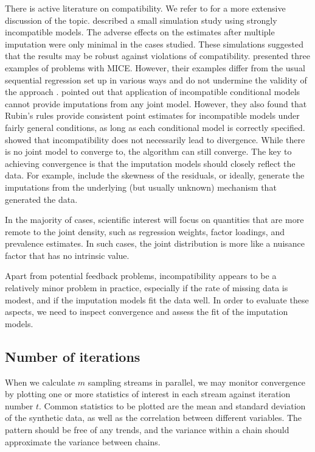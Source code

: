 \documentclass[
]{book}
\begin{document}
There is active literature on compatibility. We refer to \citet{VANBUUREN2018} for a more extensive discussion of the topic. \citet{VANBUUREN2006} described a small simulation study using strongly incompatible models. The adverse effects on the estimates after multiple imputation were only minimal in the cases studied. These simulations suggested that the results may be robust against violations of compatibility. \citet{LI2012} presented three examples of problems with MICE. However, their examples differ from the usual sequential regression set up in various ways and do not undermine the validity of the approach \citep{ZHU2015}. \citet{LIU2013} pointed out that application of incompatible conditional models cannot provide imputations from any joint model. However, they also found that Rubin's rules provide consistent point estimates for incompatible models under fairly general conditions, as long as each conditional model is correctly specified. \citet{ZHU2015} showed that incompatibility does not necessarily lead to divergence. While there is no joint model to converge to, the algorithm can still converge. The key to achieving convergence is that the imputation models should closely reflect the data. For example, include the skewness of the residuals, or ideally, generate the imputations from the underlying (but usually unknown) mechanism that generated the data.

In the majority of cases, scientific interest will focus on quantities
that are more remote to the joint density, such as regression weights,
factor loadings, and prevalence estimates. In such cases, the
joint distribution is more like a nuisance factor that has no intrinsic
value.

Apart from potential feedback problems, incompatibility appears to be a relatively minor problem in practice, especially if the rate of missing data is modest, and if the imputation models fit the data well.
In order to evaluate these aspects, we need to inspect convergence and
assess the fit of the imputation models.

\subsection{Number of iterations}\label{sec:howlarget}

When we calculate \(m\) sampling streams in parallel, we may monitor convergence by plotting one or more statistics of interest in each stream against iteration number \(t\). Common statistics to be plotted are the mean and standard deviation of the synthetic data, as well as the correlation between different variables. The pattern should be free of any trends, and the variance within a chain should approximate the variance between chains.
\end{document}
